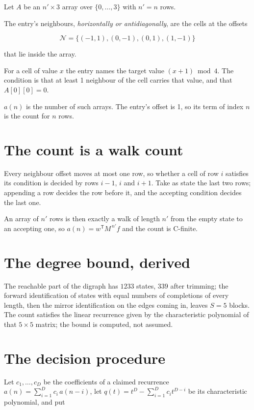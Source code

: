 \documentclass[11pt]{article}
\theoremstyle{definition}
\begin{document}
Let $A$ be an $n' \times 3$ array over $\{0,\dots,3\}$ with $n' = n$ rows.

The entry's neighbours, {\itshape horizontally or antidiagonally}, are the cells at the offsets

\[\mathcal{N} = \{(-1,1), (0,-1), (0,1), (1,-1)\}\]

that lie inside the array.

For a cell of value $x$ the entry names the target value $(x + 1) \bmod 4$. The condition is that at least 1 neighbour of the cell carries that value, and that $A[0][0] = 0$.

$a(n)$ is the number of such arrays. The entry's offset is 1, so its term of index $n$ is the count for $n$ rows.

\section{The count is a walk count}

Every neighbour offset moves at most one row, so whether a cell of row $i$ satisfies its condition is decided by rows $i-1$, $i$ and $i+1$. Take as state the last two rows; appending a row decides the row before it, and the accepting condition decides the last one.

An array of $n'$ rows is then exactly a walk of length $n'$ from the empty state to an accepting one, so $a(n) = w^{\mathsf T}M^{\,n'}f$ and the count is C-finite.

\section{The degree bound, derived}

The reachable part of the digraph has $1233$ states, $339$ after trimming; the forward identification of states with equal numbers of completions of every length, then the mirror identification on the edges coming in, leaves $S = 5$ blocks. The count satisfies the linear recurrence given by the characteristic polynomial of that $5\times5$ matrix; the bound is computed, not assumed.

\section{The decision procedure}

Let $c_1,\dots,c_D$ be the coefficients of a claimed recurrence $a(n) = \sum_{i=1}^{D} c_i\,a(n-i)$, let $q(t) = t^{D} - \sum_{i=1}^{D} c_i t^{D-i}$ be its characteristic polynomial, and put
\end{document}

